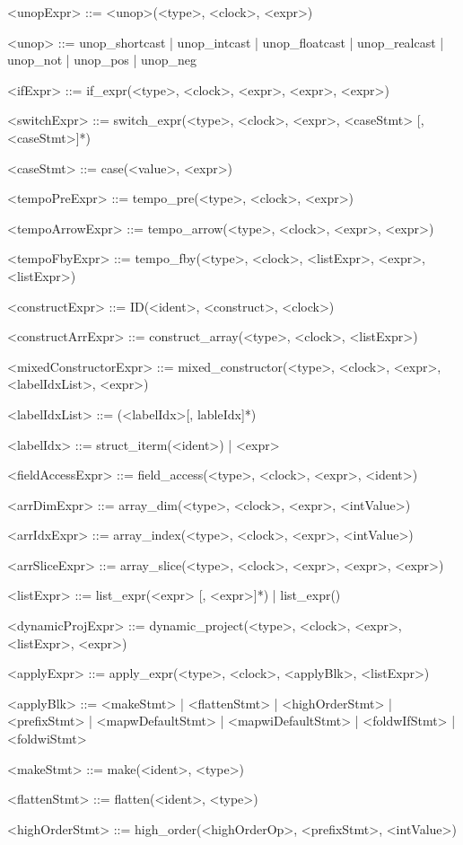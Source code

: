 \documentclass{article}
\begin{document}
\begin{grammar}
<unopExpr> ::= <unop>(<type>, <clock>, <expr>)

<unop> ::= unop_shortcast | unop_intcast | unop_floatcast |
           unop_realcast | unop_not | unop_pos | unop_neg

<ifExpr> ::= if_expr(<type>, <clock>, <expr>, <expr>, <expr>)

<switchExpr> ::= switch_expr(<type>, <clock>, <expr>, <caseStmt> [,<caseStmt>]*)

<caseStmt> ::= case(<value>, <expr>)

<tempoPreExpr> ::= tempo_pre(<type>, <clock>, <expr>)

<tempoArrowExpr> ::= tempo_arrow(<type>, <clock>, <expr>, <expr>)

<tempoFbyExpr> ::= tempo_fby(<type>, <clock>, <listExpr>, <expr>, <listExpr>)

<constructExpr> ::= ID(<ident>, <construct>, <clock>)

<constructArrExpr> ::= construct_array(<type>, <clock>, <listExpr>)

<mixedConstructorExpr> ::= mixed_constructor(<type>, <clock>, <expr>, <labelIdxList>, <expr>)

<labelIdxList> ::= (<labelIdx>[, lableIdx]*)

<labelIdx> ::= struct_iterm(<ident>) | <expr>

<fieldAccessExpr> ::= field_access(<type>, <clock>, <expr>, <ident>)

<arrDimExpr> ::= array_dim(<type>, <clock>, <expr>, <intValue>)

<arrIdxExpr> ::= array_index(<type>, <clock>, <expr>, <intValue>)

<arrSliceExpr> ::= array_slice(<type>, <clock>, <expr>, <expr>, <expr>)

<listExpr> ::= list_expr(<expr> [, <expr>]*) | list_expr()

<dynamicProjExpr> ::= dynamic_project(<type>, <clock>, <expr>, <listExpr>, <expr>)

<applyExpr> ::= apply_expr(<type>, <clock>, <applyBlk>, <listExpr>)

<applyBlk> ::= <makeStmt> | <flattenStmt> | <highOrderStmt> | <prefixStmt> |
               <mapwDefaultStmt> | <mapwiDefaultStmt> |
               <foldwIfStmt> | <foldwiStmt>

<makeStmt> ::= make(<ident>, <type>)

<flattenStmt> ::= flatten(<ident>, <type>)

<highOrderStmt> ::= high_order(<highOrderOp>, <prefixStmt>, <intValue>)


\end{grammar}
\end{document}
